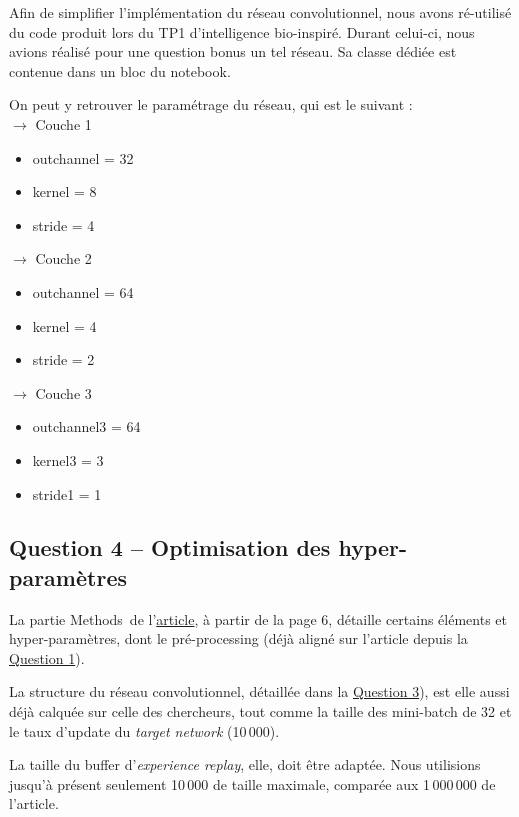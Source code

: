 \documentclass[12pt,french]{article}
\begin{document}
Afin de simplifier l'implémentation du réseau convolutionnel, nous avons ré-utilisé du code produit lors du TP1 d'intelligence bio-inspiré. Durant celui-ci, nous avions réalisé pour une question bonus un tel réseau. Sa classe dédiée est contenue dans un bloc du notebook.

On peut y retrouver le paramétrage du réseau, qui est le suivant :\\
$\longrightarrow$ Couche 1
\begin{itemize}
    \item outchannel = 32
    \item kernel = 8
    \item stride = 4
\end{itemize}
$\longrightarrow$ Couche 2
\begin{itemize}
    \item outchannel = 64
    \item kernel = 4
    \item stride = 2
\end{itemize}
$\longrightarrow$ Couche 3
\begin{itemize}
    \item outchannel3 = 64
    \item kernel3 = 3
    \item stride1 = 1
\end{itemize}

\subsection{Question 4 -- Optimisation des hyper-paramètres}

La partie \og Methods\fg\, de l'\href{https://web.stanford.edu/class/psych209/Readings/MnihEtAlHassibis15NatureControlDeepRL.pdf?fbclid=IwAR01PCi7tuNhTf-DXgXlPDALdIe_Hj6PGTkcMEGlsFadiQ-FPmtPihvTk-s}{article}, à partir de la page 6, détaille certains éléments et hyper-paramètres, dont le pré-processing (déjà aligné sur l'article depuis la \hyperref[preproc]{Question 1}).

La structure du réseau convolutionnel, détaillée dans la \hyperref[cnn]{Question 3}), est elle aussi déjà calquée sur celle des chercheurs, tout comme la taille des mini-batch de 32 et le taux d'update du \textit{target network} (10\,000).

La taille du buffer d'\textit{experience replay}, elle, doit être adaptée. Nous utilisions jusqu'à présent seulement 10\,000 de taille maximale, comparée aux 1\,000\,000 de l'article.
\end{document}
